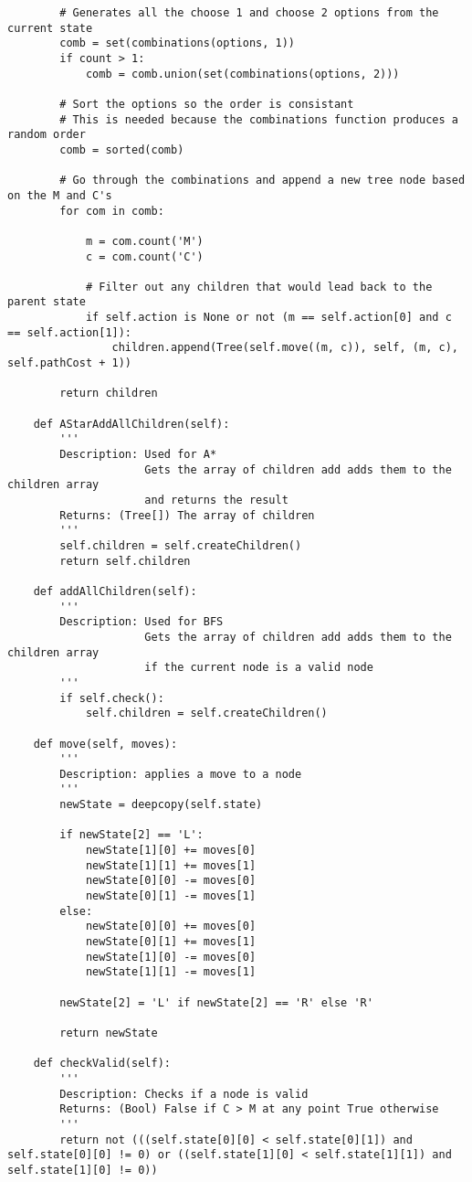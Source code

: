 \documentclass{article}
\begin{document}
\begin{verbatim}
        # Generates all the choose 1 and choose 2 options from the current state
        comb = set(combinations(options, 1))
        if count > 1:
            comb = comb.union(set(combinations(options, 2)))

        # Sort the options so the order is consistant
        # This is needed because the combinations function produces a random order
        comb = sorted(comb)

        # Go through the combinations and append a new tree node based on the M and C's
        for com in comb:

            m = com.count('M')
            c = com.count('C')

            # Filter out any children that would lead back to the parent state
            if self.action is None or not (m == self.action[0] and c == self.action[1]):
                children.append(Tree(self.move((m, c)), self, (m, c), self.pathCost + 1))

        return children

    def AStarAddAllChildren(self):
        '''
        Description: Used for A*
                     Gets the array of children add adds them to the children array
                     and returns the result
        Returns: (Tree[]) The array of children
        '''
        self.children = self.createChildren()
        return self.children

    def addAllChildren(self):
        '''
        Description: Used for BFS
                     Gets the array of children add adds them to the children array
                     if the current node is a valid node
        '''
        if self.check():
            self.children = self.createChildren()

    def move(self, moves):
        '''
        Description: applies a move to a node
        '''
        newState = deepcopy(self.state)

        if newState[2] == 'L':
            newState[1][0] += moves[0]
            newState[1][1] += moves[1]
            newState[0][0] -= moves[0]
            newState[0][1] -= moves[1]
        else:
            newState[0][0] += moves[0]
            newState[0][1] += moves[1]
            newState[1][0] -= moves[0]
            newState[1][1] -= moves[1]

        newState[2] = 'L' if newState[2] == 'R' else 'R'

        return newState

    def checkValid(self):
        '''
        Description: Checks if a node is valid
        Returns: (Bool) False if C > M at any point True otherwise
        '''
        return not (((self.state[0][0] < self.state[0][1]) and self.state[0][0] != 0) or ((self.state[1][0] < self.state[1][1]) and self.state[1][0] != 0))


\end{verbatim}
\end{document}
